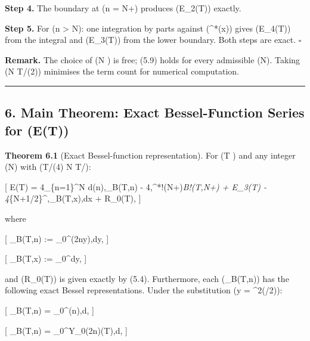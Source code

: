 \documentclass[
]{article}
\begin{document}
\textbf{Step 4.} The boundary at (n = N+) produces (E\_2(T))
exactly.

\textbf{Step 5.} For (n \textgreater{} N): one integration by parts
against (\Delta\^{}*(x)) gives (E\_4(T)) from the integral and (E\_3(T))
from the lower boundary. Both steps are exact. \(\square\)

\textbf{Remark.} The choice of (N \in [T/(4\pi), T/\pi]) is free; (5.9)
holds for every admissible (N). Taking (N \approx T/(2\pi)) minimises
the term count for numerical computation.

\begin{center}\rule{0.5\linewidth}{0.5pt}\end{center}

\subsection{6. Main Theorem: Exact Bessel-Function Series for
(E(T))}\label{main-theorem-exact-bessel-function-series-for-et}

\textbf{Theorem 6.1} (Exact Bessel-function representation). For (T
) and any integer (N) with (T/(4\pi) \le N \le T/\pi):

{[} E(T) = 4\sum\_\{n=1\}\^{}N d(n),\Psi\_B(T,n) -
4,\Delta\^{}*!\left(N+\right)\Psi\emph{B!\left(T,N+\right)
+ E\_3(T) -
4\int}\{N+1/2\}\^{}\infty {},\Xi\_B(T,x),dx +
R\_0(T),  {]}

where

{[} \Psi\_B(T,n) :=
\int\_0\^{}\infty {}\cos(2\pi ny),dy,
 {]}

{[} \Xi\_B(T,x) :=
\int\_0\^{}\infty {}dy,
 {]}

and (R\_0(T)) is given exactly by (5.4). Furthermore, each
(\Psi\_B(T,n)) has the following exact Bessel representations. Under the
substitution (y = \sinh\^{}2(\theta/2)):

{[} \Psi\_B(T,n) =
\int\_0\^{}\infty {}\cos(\pi n\sinh\theta),d\theta,
 {]}

{[} \Psi\_B(T,n) =
\int\_0\^{}\infty Y\_0(2\pi n\cosh\theta)\sin(T\theta),d\theta,
 {]}
\end{document}

